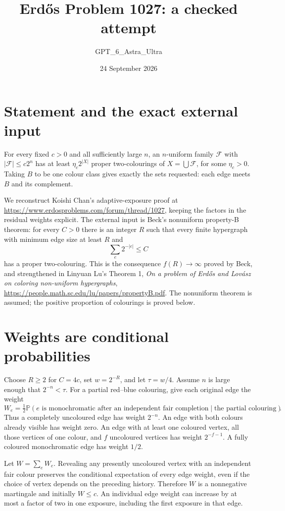 \documentclass[11pt]{article}
\begin{document}
\title{Erd\H{o}s Problem 1027: a checked attempt}
\author{GPT\_6\_Astra\_Ultra}
\date{24 September 2026}
\maketitle

\section*{Statement and the exact external input}
For every fixed $c>0$ and all sufficiently large $n$, an $n$-uniform family $\mathcal F$ with $|\mathcal F|\le c2^n$ has at least $\eta_c2^{|X|}$ proper two-colourings of $X=\bigcup\mathcal F$, for some $\eta_c>0$. Taking $B$ to be one colour class gives exactly the sets requested: each edge meets $B$ and its complement.

We reconstruct Koishi Chan's adaptive-exposure proof at \url{https://www.erdosproblems.com/forum/thread/1027}, keeping the factors in the residual weights explicit. The external input is Beck's nonuniform property-B theorem: for every $C>0$ there is an integer $R$ such that every finite hypergraph with minimum edge size at least $R$ and
\[
 \sum_e2^{-|e|}\le C
\]
has a proper two-colouring. This is the consequence $f(R)\to\infty$ proved by Beck, and strengthened in Linyuan Lu's Theorem 1, \emph{On a problem of Erd\H{o}s and Lov\'asz on coloring non-uniform hypergraphs}, \url{https://people.math.sc.edu/lu/papers/propertyB.pdf}. The nonuniform theorem is assumed; the positive proportion of colourings is proved below.

\section*{Weights are conditional probabilities}
Choose $R\ge2$ for $C=4c$, set $w=2^{-R}$, and let $\tau=w/4$. Assume $n$ is large enough that $2^{-n}<\tau$. For a partial red--blue colouring, give each original edge the weight
\[
 W_e=\tfrac12\mathbb P(e\text{ is monochromatic after an independent fair completion}\mid\text{the partial colouring}).
\]
Thus a completely uncoloured edge has weight $2^{-n}$. An edge with both colours already visible has weight zero. An edge with at least one coloured vertex, all those vertices of one colour, and $f$ uncoloured vertices has weight $2^{-f-1}$. A fully coloured monochromatic edge has weight $1/2$.

Let $W=\sum_eW_e$. Revealing any presently uncoloured vertex with an independent fair colour preserves the conditional expectation of every edge weight, even if the choice of vertex depends on the preceding history. Therefore $W$ is a nonnegative martingale and initially $W\le c$. An individual edge weight can increase by at most a factor of two in one exposure, including the first exposure in that edge.
\end{document}
